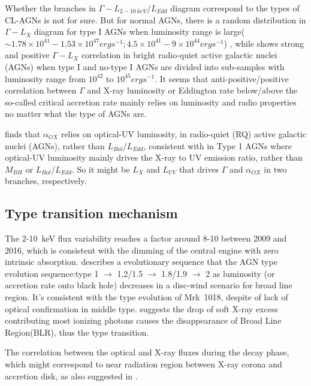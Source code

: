 \documentclass[twocolumn]{aastex63}
\begin{document}
Whether the branches in $\Gamma-L_{2-10~keV}/L_{Edd}$ diagram correspond to the types of CL-AGNs is not for sure. But for normal AGNs, there is a random distribution in $\Gamma-L_X$ diagram for type I AGNs when luminosity range is large($\sim 1.78\times 10^{41}-1.53\times 10^{47} erg s^{-1} ; 4.5\times 10^{41}-9\times 10^{44} erg s^{-1}$) \citep[see][respectively]{1997MNRAS.286..513R,2015AASP....5...79S}, while \citet{2008AJ....135.1505S} shows strong and positive $\Gamma-L_X$ correlation in bright radio-quiet active galactic nuclei (AGNs) when type I and no-type I AGNs are divided into sub-samples with luminosity range from $10^{42}$ to $10^{45} erg s^{-1}$. It seems that anti-positive/positive correlation between $\Gamma$ and X-ray luminosity or Eddington rate below/above the so-called critical accretion rate mainly relies on luminosity and radio properties no matter what the type of AGNs are. 

\citet{2008ApJ...682...81S} finds that $\alpha_{OX}$ relies on optical-UV luminosity, in radio-quiet (RQ) active galactic nuclei (AGNs), rather than $L_{Bol}/L_{Edd}$, consistent with \citet{2012MNRAS.423..600S} in Type 1 AGNs where optical-UV luminosity mainly drives the X-ray to UV emission ratio, rather than $M_{BH}$ or $L_{Bol}/L_{Edd}$. So it might be $L_{X}$ and $L_{UV}$ that drives $\Gamma$ and $\alpha_{OX}$ in two branches, respectively.






\subsection{Type transition mechanism}
The 2-10~keV flux variability reaches a factor around 8-10 between 2009 and 2016, which is consistent with the dimming of the central engine with zero intrinsic absorption. \citet{2014MNRAS.438.3340E} describes a evolutionary sequence that the AGN type evolution sequence:type 1 $\to$ 1.2/1.5 $\to$ 1.8/1.9 $\to$ 2 as luminosity (or accretion rate onto black hole) decreases in a disc-wind scenario for broad line region. It's consistent with the type evolution of Mrk~1018, despite of lack of optical confirmation in middle type. \citet{2018MNRAS.480.3898N} suggests the drop of soft X-ray excess contributing most ionizing photons causes the disappearance of Broad Line Region(BLR), thus the type transition.




The correlation between the optical and X-ray fluxes during the decay phase, which might correspond to near radiation region  between X-ray corona and accretion disk, as also suggested in \citet{2017A&A...607L...9K}.
\end{document}
